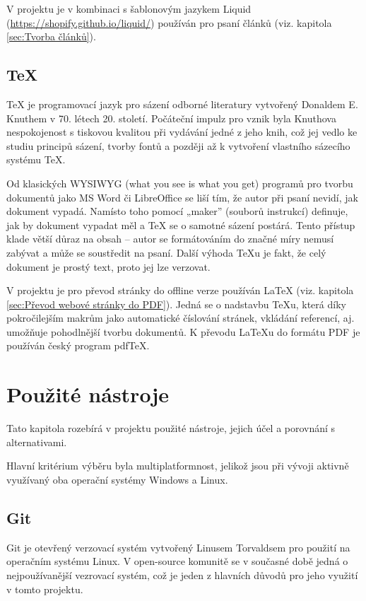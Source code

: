\documentclass[a4paper, 12pt]{article}
\begin{document}
  V projektu je v kombinaci s šablonovým jazykem Liquid (\url{https://shopify.github.io/liquid/}) používán pro psaní článků (viz. kapitola \ref{sec:Tvorba článků}).


  \subsection{\TeX} \label{sec:TeX}
  \TeX{} je programovací jazyk pro sázení odborné literatury vytvořený Donaldem E. Knuthem v 70. létech 20. století. Počáteční impulz pro vznik byla Knuthova nespokojenost s tiskovou kvalitou při vydávání jedné z jeho knih, což jej vedlo ke studiu principů sázení, tvorby fontů a později až k vytvoření vlastního sázecího systému \TeX\cite{tex-history}.

  Od klasických WYSIWYG (what you see is what you get) programů pro tvorbu dokumentů jako MS Word či LibreOffice se liší tím, že autor při psaní nevidí, jak dokument vypadá. Namísto toho pomocí „maker” (souborů instrukcí) definuje, jak by dokument vypadat měl a \TeX{} se o samotné sázení postárá. Tento přístup klade větší důraz na obsah -- autor se formátováním do značné míry nemusí zabývat a může se soustředit na psaní. Další výhoda \TeX u je fakt, že celý dokument je prostý text, proto jej lze verzovat.

  V projektu je pro převod stránky do offline verze používán \LaTeX{} (viz. kapitola \ref{sec:Převod webové stránky do PDF}). Jedná se o nadstavbu \TeX u, která díky pokročilejším makrům jako automatické číslování stránek, vkládání referencí, aj. umožňuje pohodlnější tvorbu dokumentů\cite{getting-started-with-latex}. K převodu \LaTeX u do formátu PDF je používán český program pdf\TeX{}\cite{pdftex}.


  \section{Použité nástroje} \label{sec:Použité nástroje}
  Tato kapitola rozebírá v projektu použité nástroje, jejich účel a porovnání s alternativami.

  Hlavní kritérium výběru byla multiplatformnost, jelikož jsou při vývoji aktivně využívaný oba operační systémy Windows a Linux.


  \subsection{Git} \label{sec:Git}
  Git je otevřený\cite{git-source} verzovací systém vytvořený Linusem Torvaldsem pro použití na operačním systému Linux. V open-source komunitě se v současné době jedná o nejpoužívanější vezrovací systém\cite{version-control-usage-statistics}, což je jeden z hlavních důvodů pro jeho využití v tomto projektu.
\end{document}
